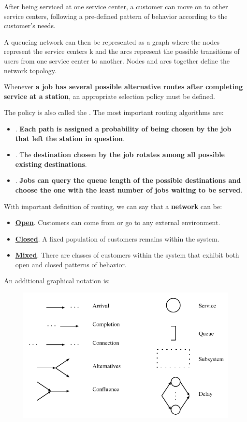 \begin{itemize}
	After being serviced at one service center, a customer can move on to other service centers, following a pre-defined pattern of behavior according to the customer's needs.
	
	A queueing network can then be represented as a graph where the nodes represent the service centers k and the arcs represent the possible transitions of users from one service center to another. Nodes and arcs together define the network topology.
	
	Whenever \textbf{a job has several possible alternative routes after completing service at a station}, an appropriate selection policy must be defined.
	
	The policy is also called the . The most important routing algorithms are:
	\begin{itemize}
		\item {}. \textbf{Each path is assigned a probability of being chosen by the job that left the station in question}.
		
		\item {}. The \textbf{destination chosen by the job rotates among all possible existing destinations}.
		
		\item {}. \textbf{Jobs can query the queue length of the possible destinations and choose the one with the least number of jobs waiting to be served}.
	\end{itemize}
\end{itemize}
With important definition of routing, we can say that a \textbf{network} can be:
\begin{itemize}
	\item \textbf{\underline{Open}}. Customers can come from or go to any external environment.
	\item \textbf{\underline{Closed}}. A fixed population of customers remains within the system.
	\item \textbf{\underline{Mixed}}. There are classes of customers within the system that exhibit both open and closed patterns of behavior.
\end{itemize}
An additional graphical notation is:
\begin{figure}[!htp]
	\centering
	\includegraphics[width=\textwidth]{img/queueing-network-8.png}
\end{figure}


